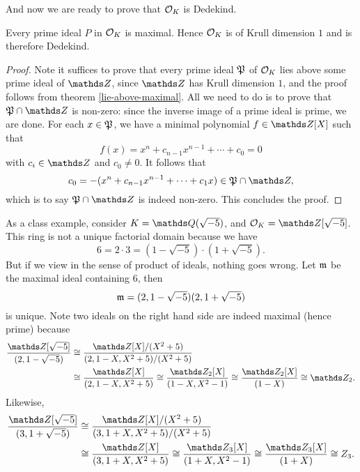 			And now we are ready to prove that $\mathcal{O}_K$ is Dedekind.
			
			\begin{theorem}\label{o_k-dedekind}
				Every prime ideal $P$ in $\mathcal{O}_K$ is maximal. Hence $\mathcal{O}_K$ is of Krull dimension $1$ and is therefore Dedekind.
			\end{theorem}
			
			\begin{proof}
				Note it suffices to prove that every prime ideal $\mathfrak{P}$ of $\mathcal{O}_K$ lies above some prime ideal of $\Z$, since $\Z$ has Krull dimension $1$, and the proof follows from theorem \ref{lie-above-maximal}. All we need to do is to prove that $\mfk{P} \cap \Z$ is non-zero: since the inverse image of a prime ideal is prime, we are done. For each $x \in \mathfrak{P}$, we have a minimal polynomial $f \in \Z[X]$ such that
				\[
					f(x) = x^n+c_{n-1}x^{n-1}+\cdots+c_0=0
				\]
				with $c_i \in \Z$ and $c_0 \ne 0$. It follows that
				\[
					c_0=-(x^n+c_{n-1}x^{n-1}+\cdots+c_1x) \in \mfk{P} \cap \Z,
				\]
				which is to say $\mfk{P} \cap \Z$ is indeed non-zero. This concludes the proof.
			\end{proof}
			\begin{example}
				As a class example, consider $K=\Q(\sqrt{-5})$, and $\OK = \Z[\sqrt{-5}]$. This ring is not a unique factorial domain because we have
				\[
					6 = 2 \cdot 3 = (1-\sqrt{-5}) \cdot (1+\sqrt{-5}).
				\]
				But if we view in the sense of product of ideals, nothing goes wrong. Let $\mathfrak{m}$ be the maximal ideal containing $6$, then
				\[
					\mathfrak{m} = (2,1-\sqrt{-5})(2,1+\sqrt{-5})
				\]
				is unique. Note two ideals on the right hand side are indeed maximal (hence prime) because
				\[
					\begin{aligned}
						\frac{\Z[\sqrt{-5}]}{(2,1-\sqrt{-5})} &\cong \frac{\Z[X]/(X^2+5)}{(2,1-X,X^2+5)/(X^2+5)} \\
															 &\cong \frac{\Z[X]}{(2,1-X,X^2+5)} \cong \frac{\Z_2[X]}{(1-X,X^2-1)} \cong \frac{\Z_2[X]}{(1-X)} \cong \Z_2.
					\end{aligned}
				\]
				Likewise,
				\[
					\begin{aligned}
						\frac{\Z[\sqrt{-5}]}{(3,1+\sqrt{-5})} &\cong \frac{\Z[X]/(X^2+5)}{(3,1+X,X^2+5)/(X^2+5)} \\
															  &\cong \frac{\Z[X]}{(3,1+X,X^2+5)} \cong \frac{\Z_3[X]}{(1+X,X^2-1)} \cong \frac{\Z_3[X]}{(1+X)} \cong Z_3.
					\end{aligned}
				\]
			\end{example}
		
